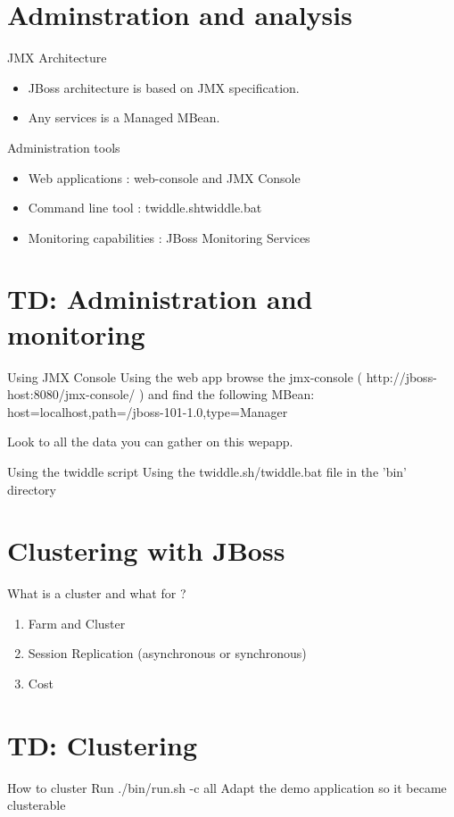 \documentclass[handout]{beamer}
\begin{document}
\section{Adminstration and analysis}
	\begin{frame}
		\begin{block}{JMX Architecture}
			\begin{itemize}
			\item JBoss architecture is based on JMX specification.
			\item Any services is a Managed MBean.
			\end{itemize}
		\end{block}
		\begin{block}{Administration tools}
			\begin{itemize}
		 		\item Web applications : web-console and JMX Console
				\item Command line tool : twiddle.sh\/twiddle.bat
				\item Monitoring capabilities : JBoss Monitoring Services
			\end{itemize}
		\end{block}
	\end{frame}
\section{TD: Administration and monitoring}
	\begin{frame}
		\begin{block}{Using JMX Console}
			Using the web app browse the jmx-console ( http://jboss-host:8080/jmx-console/ ) and find the following MBean:
			host=localhost,path=/jboss-101-1.0,type=Manager

			Look to all the data you can gather on this wepapp.
		\end{block}
		\begin{block}{Using the twiddle script}
		 	Using the twiddle.sh/twiddle.bat file in the 'bin' directory
		\end{block}

	\end{frame}
\section{Clustering with JBoss}
	\begin{frame}
		\begin{block}{What is a cluster and what for ?}	
			\begin{enumerate}
				\item Farm and Cluster	
				\item Session Replication (asynchronous or synchronous)
				\item Cost
			\end{enumerate}
		\end{block}
	\end{frame}
\section{TD: Clustering}
	\begin{frame}
		\begin{block}{How to cluster}
			Run ./bin/run.sh -c all
			Adapt the demo application so it became clusterable
		\end{block}
	\end{frame}
\end{document}
